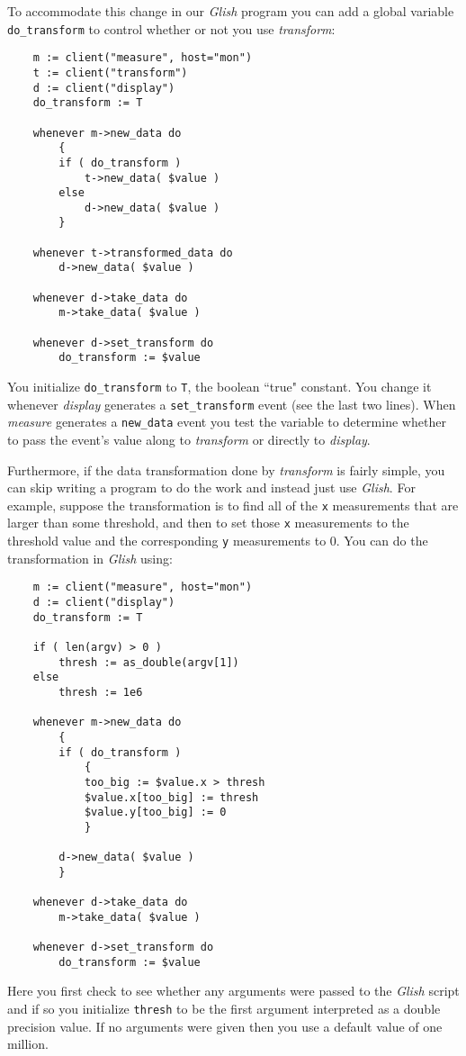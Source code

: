 To accommodate this change in our {\em Glish} program you can add a global
variable {\tt do\_transform} to control whether or not you use {\em transform\/}:
\begin{verbatim}
    m := client("measure", host="mon")
    t := client("transform")
    d := client("display")
    do_transform := T

    whenever m->new_data do
        {
        if ( do_transform )
            t->new_data( $value )
        else
            d->new_data( $value )
        }

    whenever t->transformed_data do
        d->new_data( $value )

    whenever d->take_data do
        m->take_data( $value )

    whenever d->set_transform do
        do_transform := $value
\end{verbatim}
You initialize {\tt do\_transform} to {\tt T}, the boolean ``true" constant.
You change it whenever {\em display} generates a {\tt set\_transform} event
(see the last two lines).  When {\em measure} generates a {\tt new\_data}
event you test the variable to determine whether to pass the event's value
along to {\em transform} or directly to {\em display\/}.

Furthermore, if the data transformation done by {\em transform} is fairly
simple, you can skip writing a program to do the work and instead just
use {\em Glish}.
For example, suppose the transformation is to find all of
the {\tt x} measurements that are larger than some threshold, and then
to set those {\tt x} measurements to the threshold value and the
corresponding {\tt y} measurements to 0.  You can do the transformation
in {\em Glish} using:
\begin{verbatim}
    m := client("measure", host="mon")
    d := client("display")
    do_transform := T

    if ( len(argv) > 0 )
        thresh := as_double(argv[1])
    else
        thresh := 1e6

    whenever m->new_data do
        {
        if ( do_transform )
            {
            too_big := $value.x > thresh
            $value.x[too_big] := thresh
            $value.y[too_big] := 0
            }

        d->new_data( $value )
        }

    whenever d->take_data do
        m->take_data( $value )

    whenever d->set_transform do
        do_transform := $value
\end{verbatim}
Here you first check to see whether any arguments were passed to
the {\em Glish} script and if so you initialize {\tt thresh} to be
the first argument interpreted as a double precision value.  If
no arguments were given then you use a default value of one million.

